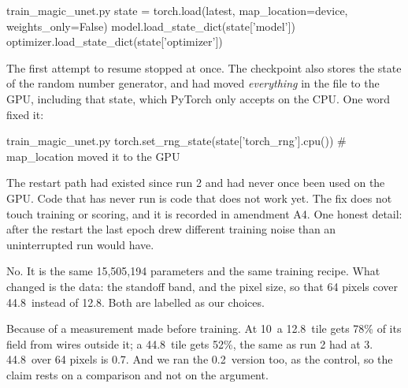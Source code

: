 \begin{code*}{train_magic_unet.py}
        state = torch.load(latest, map_location=device, weights_only=False)
        model.load_state_dict(state['model'])
        optimizer.load_state_dict(state['optimizer'])
\end{code*}

The first attempt to resume stopped at once. The checkpoint also stores the state of the random number generator, and
 had moved \emph{everything} in the file to the GPU, including that state, which PyTorch only
accepts on the CPU. One word fixed it:

\begin{code*}{train_magic_unet.py}
        torch.set_rng_state(state['torch_rng'].cpu())      # map_location moved it to the GPU
\end{code*}

\begin{careful}
The restart path had existed since run 2 and had never once been used on the GPU. Code that has never run is code
that does not work yet. The fix does not touch training or scoring, and it is recorded in amendment A4. One honest
detail: after the restart the last epoch drew different training noise than an uninterrupted run would have.
\end{careful}

\begin{defend}
No. It is the same 15{,}505{,}194 parameters and the same training recipe. What changed is the data: the standoff
band, and the pixel size, so that 64 pixels cover 44.8\um\ instead of 12.8\um. Both are labelled as our choices.
\end{defend}

\begin{defend}
Because of a measurement made before training. At 10\um\ a 12.8\um\ tile gets 78\% of its field from wires outside it; a
44.8\um\ tile gets 52\%, the same as run 2 had at 3\um. 44.8\um\ over 64 pixels is 0.7\um. And we ran the 0.2\um\ version too,
as the control, so the claim rests on a comparison and not on the argument.
\end{defend}

